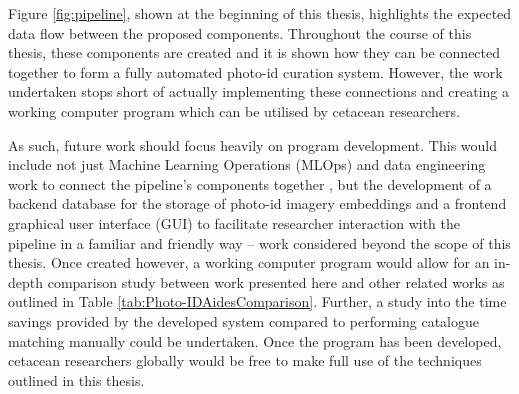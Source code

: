 Figure \ref{fig:pipeline}, shown at the beginning of this thesis, highlights the expected data flow between the proposed components. Throughout the course of this thesis, these components are created and it is shown how they can be connected together to form a fully automated photo-id curation system. However, the work undertaken stops short of actually implementing these connections and creating a working computer program which can be utilised by cetacean researchers. 

As such, future work should focus heavily on program development. This would include not just Machine Learning Operations (MLOps) and data engineering work to connect the pipeline's components together \cite{zhou_towards_2020}, but the development of a backend database for the storage of photo-id imagery embeddings and a frontend graphical user interface (GUI) to facilitate researcher interaction with the pipeline in a familiar and friendly way -- work considered beyond the scope of this thesis. Once created however, a working computer program would allow for an in-depth comparison study between work presented here and other related works as outlined in Table \ref{tab:Photo-IDAidesComparison}. Further, a study into the time savings provided by the developed system compared to performing catalogue matching manually could be undertaken. Once the program has been developed, cetacean researchers globally would be free to make full use of the techniques outlined in this thesis. 

